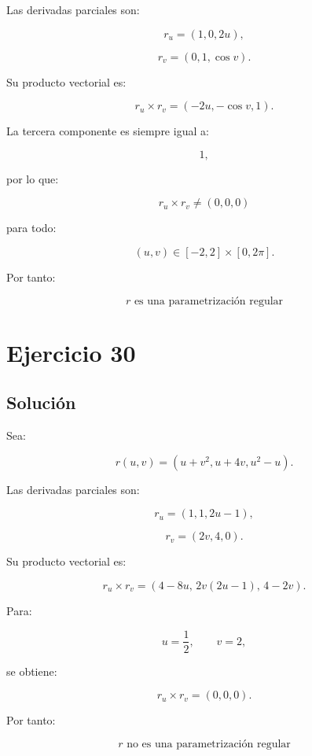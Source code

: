\documentclass[11pt,a4paper]{article}
\begin{document}
Las derivadas parciales son:

\[
r_u
=
(1,0,2u),
\]

\[
r_v
=
(0,1,\cos v).
\]

Su producto vectorial es:

\[
r_u\times r_v
=
(-2u,-\cos v,1).
\]

La tercera componente es siempre igual a:

\[
1,
\]

por lo que:

\[
r_u\times r_v\neq(0,0,0)
\]

para todo:

\[
(u,v)\in[-2,2]\times[0,2\pi].
\]

Por tanto:

\[
\boxed{
r\text{ es una parametrización regular}
}
\]

\section{Ejercicio 30}
\subsection{Solución}

Sea:

\[
r(u,v)
=
(u+v^2,u+4v,u^2-u).
\]

Las derivadas parciales son:

\[
r_u
=
(1,1,2u-1),
\]

\[
r_v
=
(2v,4,0).
\]

Su producto vectorial es:

\[
r_u\times r_v
=
(4-8u,\,
2v(2u-1),\,
4-2v).
\]

Para:

\[
u=\frac12,
\qquad
v=2,
\]

se obtiene:

\[
r_u\times r_v
=
(0,0,0).
\]

Por tanto:

\[
\boxed{
r\text{ no es una parametrización regular}
}
\]
\end{document}
